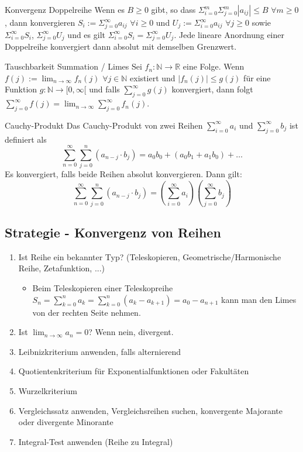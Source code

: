 \documentclass[a4paper,10pt]{article}
\def\limn{\lim_{n\to \infty}}
\begin{document}
\begin{subbox}{Konvergenz Doppelreihe}
  Wenn es $B \geq 0$ gibt, so dass $\Sigma_{i=0}^m \Sigma_{j=0}^m |a_{ij}| \leq B$ $\forall m \geq 0$, dann konvergieren $S_i := \Sigma_{j=0}^\infty a_{ij}$ $\forall i \geq 0$ und $U_j := \Sigma_{i=0}^\infty a_{ij}$ $\forall j \geq 0$ sowie $\Sigma_{i=0}^\infty S_i$, $\Sigma_{j=0}^\infty U_j$ und es gilt $\Sigma_{i=0}^\infty S_i = \Sigma_{j=0}^\infty U_j$. Jede lineare Anordnung einer Doppelreihe konvergiert dann absolut mit demselben Grenzwert.
\end{subbox}

\begin{subbox}{Tauschbarkeit Summation / Limes}
  Sei $f_n : \mathbb{N} \rightarrow \mathbb{R}$ eine Folge. Wenn $f(j) := \limn f_n(j)$ $\forall j \in \mathbb{N}$ existiert und $|f_n(j)| \leq g(j)$ für eine Funktion $g: \mathbb{N} \rightarrow \mathbb [0, \infty[$ und falls $\sum_{j=0}^\infty g(j)$ konvergiert, dann folgt $\sum_{j=0}^\infty f(j) = \limn \sum_{j=0}^\infty f_n(j)$.
\end{subbox}

\begin{mainbox}{Cauchy-Produkt}
  Das Cauchy-Produkt von zwei Reihen $\sum_{i = 0}^\infty a_i$ und $\sum_{j = 0}^\infty b_j$ ist definiert als
  $$\sum_{n=0}^\infty \sum_{j=0}^n (a_{n-j} \cdot b_j) = a_0b_0 + (a_0b_1 + a_1b_0) + \ldots$$ Es konvergiert, falls beide Reihen absolut konvergieren. Dann gilt:\\
  $$\sum_{n=0}^\infty \sum_{j=0}^n (a_{n-j} \cdot b_j) = (\sum_{i=0}^\infty a_i) (\sum_{j=0}^\infty b_j)$$
\end{mainbox}


\subsection{Strategie - Konvergenz von Reihen}
\begin{enumerate}
 \item Ist Reihe ein bekannter Typ? (Teleskopieren, Geometrische/Harmonische Reihe, Zetafunktion, ...){
  \begin{itemize}
    \item Beim Teleskopieren einer Teleskopreihe $S_n = \sum_{k=0}^n a_k = \sum_{k=0}^n (a_k - a_{k+1}) = a_0 - a_{n+1}$ kann man den Limes von der rechten Seite nehmen.
  \end{itemize}
 }
 \item Ist $\limn a_n = 0$? Wenn nein, divergent.
 \item Leibnizkriterium anwenden, falls alternierend
 \item Quotientenkriterium für Exponentialfunktionen oder Fakultäten
 \item Wurzelkriterium
 \item Vergleichssatz anwenden, Vergleichsreihen suchen, konvergente Majorante oder divergente Minorante
 \item Integral-Test anwenden (Reihe zu Integral)
\end{enumerate}
\end{document}
